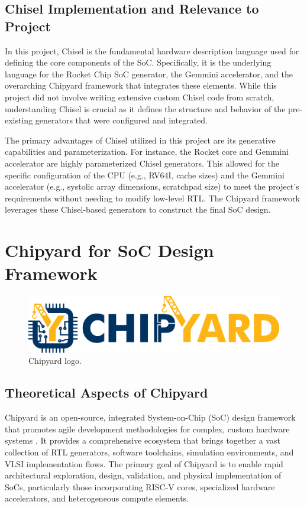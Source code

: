 \subsection{Chisel Implementation and Relevance to Project}
\label{sec:chisel_implementation}
In this project, Chisel is the fundamental hardware description language used for defining the core components of the SoC. Specifically, it is the underlying language for the Rocket Chip SoC generator, the Gemmini accelerator, and the overarching Chipyard framework that integrates these elements. While this project did not involve writing extensive custom Chisel code from scratch, understanding Chisel is crucial as it defines the structure and behavior of the pre-existing generators that were configured and integrated.

The primary advantages of Chisel utilized in this project are its generative capabilities and parameterization. For instance, the Rocket core and Gemmini accelerator are highly parameterized Chisel generators. This allowed for the specific configuration of the CPU (e.g., RV64I, cache sizes) and the Gemmini accelerator (e.g., systolic array dimensions, scratchpad size) to meet the project's requirements without needing to modify low-level RTL. The Chipyard framework leverages these Chisel-based generators to construct the final SoC design.

\section{Chipyard for SoC Design Framework}
\label{sec:chipyard_framework}

\begin{figure}[htbp]
    \centering
    \includegraphics[width=0.75\linewidth]{Images/02_Chipyard_ChipyardLogo.pdf}
    \caption{Chipyard logo.}
    \label{fig:chipyard_logo}
\end{figure}

\subsection{Theoretical Aspects of Chipyard}
\label{sec:chipyard_theoretical}
Chipyard is an open-source, integrated System-on-Chip (SoC) design framework that promotes agile development methodologies for complex, custom hardware systems \cite{chipyard}. It provides a comprehensive ecosystem that brings together a vast collection of RTL generators, software toolchains, simulation environments, and VLSI implementation flows. The primary goal of Chipyard is to enable rapid architectural exploration, design, validation, and physical implementation of SoCs, particularly those incorporating RISC-V cores, specialized hardware accelerators, and heterogeneous compute elements.

